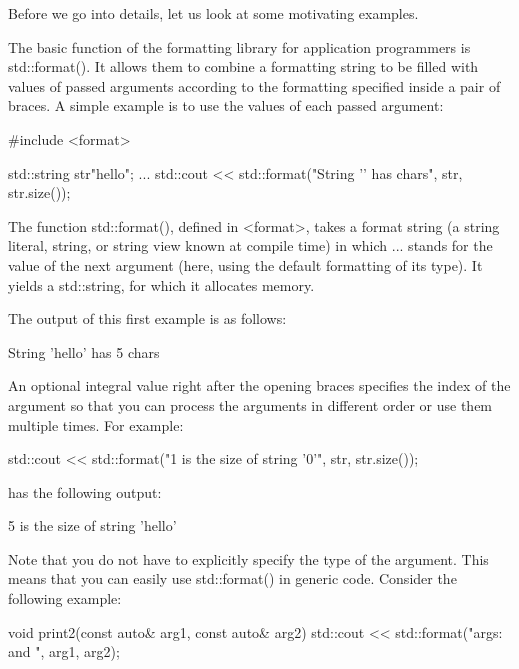 
Before we go into details, let us look at some motivating examples.


The basic function of the formatting library for application programmers is std::format(). It allows them to combine a formatting string to be filled with values of passed arguments according to the formatting specified inside a pair of braces. A simple example is to use the values of each passed argument:

\begin{cpp}
#include <format>

std::string str{"hello"};
...
std::cout << std::format("String '{}' has {} chars\n", str, str.size());
\end{cpp}

The function std::format(), defined in <format>, takes a format string (a string literal, string, or string view known at compile time) in which {...} stands for the value of the next argument (here, using the default formatting of its type). It yields a std::string, for which it allocates memory.

The output of this first example is as follows:

\begin{shell}
String ’hello’ has 5 chars
\end{shell}

An optional integral value right after the opening braces specifies the index of the argument so that you can process the arguments in different order or use them multiple times. For example:

\begin{cpp}
std::cout << std::format("{1} is the size of string '{0}'\n", str, str.size());
\end{cpp}

has the following output:

\begin{shell}
5 is the size of string ’hello’
\end{shell}

Note that you do not have to explicitly specify the type of the argument. This means that you can easily use std::format() in generic code. Consider the following example:

\begin{cpp}
void print2(const auto& arg1, const auto& arg2)
{
	std::cout << std::format("args: {} and {}\n", arg1, arg2);
}
\end{cpp}

